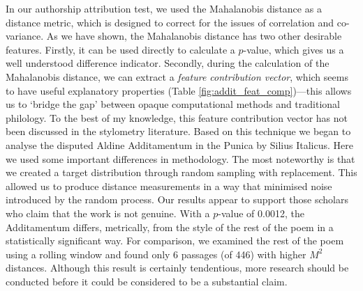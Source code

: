 \documentclass[11pt,a4paper]{scrartcl} %
\begin{document}
{In our authorship attribution test, we used the Mahalanobis distance as a distance metric, which is designed to correct for the issues of correlation and co-variance. As we have shown, the Mahalanobis distance has two other desirable features. Firstly, it can be used directly to calculate a $p$-value, which gives us a well understood difference indicator. Secondly, during the calculation of the Mahalanobis distance, we can extract a \textit{feature contribution vector}, which seems to have useful explanatory properties (Table \ref{fig:addit_feat_comp})---this allows us to `bridge the gap' between opaque computational methods and traditional philology. To the best of my knowledge, this feature contribution vector has not been discussed in the stylometry literature. Based on this technique we began to analyse the disputed Aldine Additamentum in the Punica by Silius Italicus. Here we used some important differences in methodology. The most noteworthy is that we created a target distribution through random sampling with replacement. This allowed us to produce distance measurements in a way that minimised noise introduced by the random process. Our results appear to support those scholars who claim that the work is not genuine. With a $p$-value of 0.0012, the Additamentum differs, metrically, from the style of the rest of the poem in a statistically significant way. For comparison, we examined the rest of the poem using a rolling window and found only 6 passages (of 446) with higher $M^{2}$ distances. Although this result is certainly tendentious, more research should be conducted before it could be considered to be a substantial claim.
\newpage
}
\end{document}
